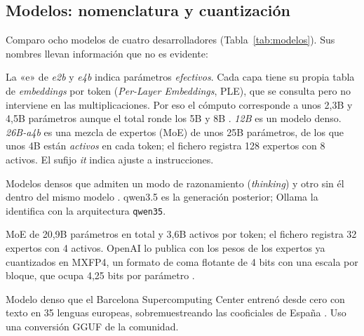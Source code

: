 \documentclass{article}
\begin{document}
\subsection{Modelos: nomenclatura y cuantización}

Comparo ocho modelos de cuatro desarrolladores (Tabla~\ref{tab:modelos}).
Sus nombres llevan información que no es evidente:

\begin{description}\setlength{\itemsep}{1pt}\setlength{\parskip}{0pt}
  \item[gemma4 (Google DeepMind).] La «e» de \emph{e2b} y \emph{e4b} indica
  parámetros \emph{efectivos}. Cada capa tiene su propia tabla de
  \emph{embeddings} por token (\emph{Per-Layer Embeddings}, PLE), que se
  consulta pero no interviene en las multiplicaciones. Por eso el cómputo
  corresponde a unos 2,3B y 4,5B parámetros aunque el total ronde los 5B y 8B
  \citep{gemma4card,gemma4report}. \emph{12B} es un modelo denso.
  \emph{26B-a4b} es una mezcla de expertos (MoE) de unos 25B parámetros, de
  los que unos 4B están \emph{activos} en cada token; el fichero registra 128
  expertos con 8 activos. El sufijo \emph{it} indica ajuste a instrucciones.
  \item[qwen3 y qwen3.5 (Alibaba, equipo Qwen).] Modelos densos que admiten
  un modo de razonamiento (\emph{thinking}) y otro sin él dentro del mismo
  modelo \citep{qwen3report}. qwen3.5 es la generación posterior; Ollama la
  identifica con la arquitectura \texttt{qwen35}.
  \item[gpt-oss-20b (OpenAI).] MoE de 20,9B parámetros en total y 3,6B
  activos por token; el fichero registra 32 expertos con 4 activos. OpenAI lo
  publica con los pesos de los expertos ya cuantizados en MXFP4, un formato de
  coma flotante de 4 bits con una escala por bloque, que ocupa 4,25 bits por
  parámetro \citep{openai2025gptoss}.
  \item[salamandra-7b-instruct (BSC).] Modelo denso que el Barcelona
  Supercomputing Center entrenó desde cero con texto en 35 lenguas europeas,
  sobremuestreando las cooficiales de España \citep{salamandra}. Uso una
  conversión GGUF de la comunidad.
\end{description}
\end{document}

